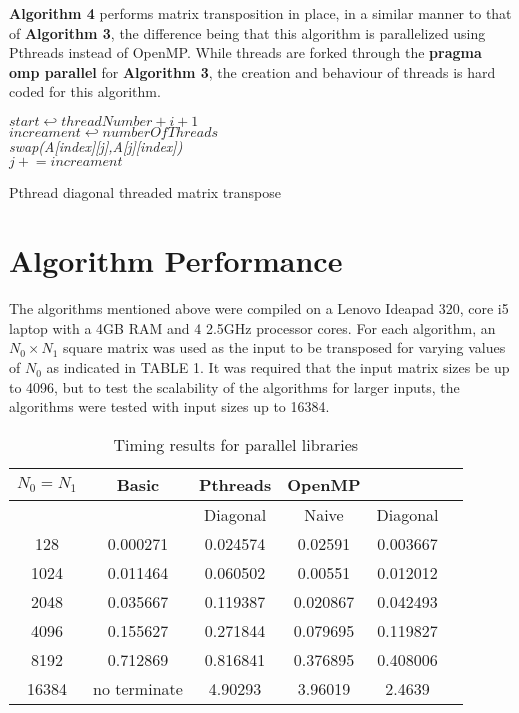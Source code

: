 \documentclass[11pt]{IEEEtran}
\begin{document}
\noindent
\textbf{Algorithm 4} performs matrix transposition in place, in a similar manner to that of \textbf{Algorithm 3}, the difference being that this algorithm is parallelized using Pthreads instead of OpenMP. While threads are forked through the \textbf{pragma omp parallel} for \textbf{Algorithm 3}, the creation and behaviour of threads is hard coded for this algorithm.
\begin{algorithm}[H]
  
 {
   $start \hookleftarrow threadNumber + i + 1$ \\
   $increament \hookleftarrow numberOfThreads$\\
   
  {
    \emph{swap(A[index][j],A[j][index])} \\
    $j\mathrel{+}= increament$
  }
 }
 \caption{Pthread diagonal threaded matrix transpose}
\end{algorithm}

\section{Algorithm Performance}

\noindent
The algorithms mentioned above were compiled on a Lenovo Ideapad 320, core i5 laptop with a 4GB RAM and 4 2.5GHz processor cores. For each algorithm, an $N_0 \times N_1$ square matrix was used as the input to be transposed for varying values of $N_0$ as indicated in TABLE 1. It was required that the input matrix sizes be up to 4096, but to test the scalability of the algorithms for larger inputs, the algorithms were tested with input sizes up to 16384. 

\begin{table}[H] 
\caption{Timing results for parallel libraries}
\centering
\begin{tabular}{|c|c|c|cc|c|}
\hline
$N_0 = N_1$ & Basic & Pthreads & OpenMP&\\
\hline
     &          & Diagonal & Naive    & Diagonal \\
\hline
128  & 0.000271 & 0.024574 & 0.02591  & 0.003667\\
1024 & 0.011464 & 0.060502 & 0.00551  & 0.012012\\
2048 & 0.035667 & 0.119387 & 0.020867 & 0.042493\\
4096 & 0.155627 & 0.271844 & 0.079695 & 0.119827\\
8192 & 0.712869 & 0.816841 & 0.376895 & 0.408006 \\
16384&no terminate& 4.90293& 3.96019  & 2.4639 \\
\hline
\end{tabular}
\end{table}
\end{document}
